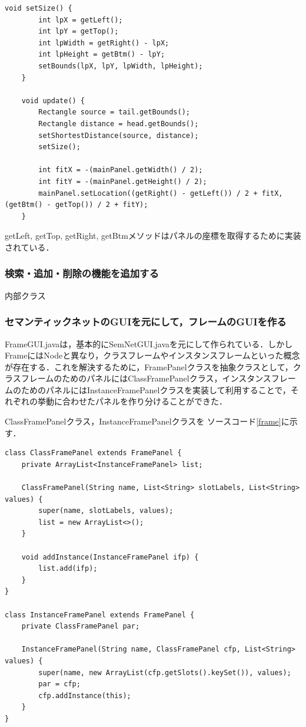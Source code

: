 \documentclass[12pt]{jarticle}
\begin{document}
\begin{lstlisting}[caption=setSizeメソッド・updateメソッド, label=update]
    void setSize() {
        int lpX = getLeft();
        int lpY = getTop();
        int lpWidth = getRight() - lpX;
        int lpHeight = getBtm() - lpY;
        setBounds(lpX, lpY, lpWidth, lpHeight);
    }

    void update() {
        Rectangle source = tail.getBounds();
        Rectangle distance = head.getBounds();
        setShortestDistance(source, distance);
        setSize();

        int fitX = -(mainPanel.getWidth() / 2);
        int fitY = -(mainPanel.getHeight() / 2);
        mainPanel.setLocation((getRight() - getLeft()) / 2 + fitX, (getBtm() - getTop()) / 2 + fitY);
    }
\end{lstlisting}

getLeft, getTop, getRight, getBtmメソッドはパネルの座標を取得するために実装されている．

\subsubsection{検索・追加・削除の機能を追加する}
内部クラス

\subsubsection{セマンティックネットのGUIを元にして，フレームのGUIを作る}
FrameGUI.javaは，基本的にSemNetGUI.javaを元にして作られている．しかしFrameにはNodeと異なり，クラスフレームやインスタンスフレームといった概念が存在する．これを解決するために，FramePanelクラスを抽象クラスとして，クラスフレームのためのパネルにはClassFramePanelクラス，インスタンスフレームのためのパネルにはInstanceFramePanelクラスを実装して利用することで，それぞれの挙動に合わせたパネルを作り分けることができた．

ClassFramePanelクラス，InstanceFramePanelクラスを
ソースコード\ref{frame}に示す．

\begin{lstlisting}[caption=ClassFramePanelクラス・InstanceFramePanelクラス, label=frame]
class ClassFramePanel extends FramePanel {
    private ArrayList<InstanceFramePanel> list;

    ClassFramePanel(String name, List<String> slotLabels, List<String> values) {
        super(name, slotLabels, values);
        list = new ArrayList<>();
    }

    void addInstance(InstanceFramePanel ifp) {
        list.add(ifp);
    }
}

class InstanceFramePanel extends FramePanel {
    private ClassFramePanel par;

    InstanceFramePanel(String name, ClassFramePanel cfp, List<String> values) {
        super(name, new ArrayList(cfp.getSlots().keySet()), values);
        par = cfp;
        cfp.addInstance(this);
    }
}
\end{lstlisting}
\end{document}
